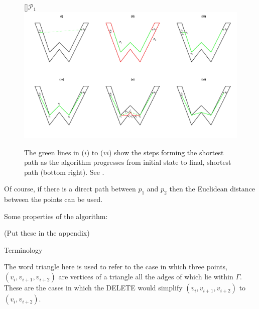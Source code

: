 \begin{figure}
\centering
[]{$\mathcal{P}_1$}
\includegraphics[trim=0in 0.5in 0in 0.25in, width=9.5in]{mds/figs/wdia.pdf} \\
\caption{The green lines in ($i$) to ($vi$) show the steps forming the shortest path as the algorithm progresses from initial state to final, shortest path (bottom right). See .}
\label{wdia}
\end{figure}

Of course, if there is a direct path between $p_1$ and $p_2$ then the Euclidean distance between the points can be used.





Some properties of the algorithm:

(Put these in the appendix)

Terminology

The word triangle here is used to refer to the case in which three points, $(v_i,v_{i+1},v_{i+2})$ are vertices of a triangle all the adges of which lie within $\Gamma$. These are the cases in which the DELETE would simplify $(v_i,v_{i+1},v_{i+2})$ to $(v_i,v_{i+2})$.


